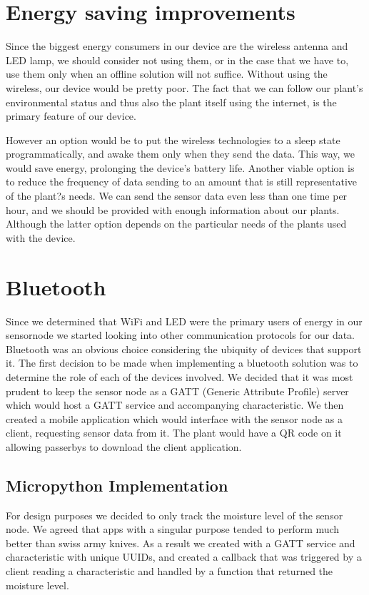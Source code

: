 \documentclass[10pt]{sensys-proc}
\begin{document}
\section{Energy saving improvements}
Since the biggest energy consumers in our device are the wireless antenna and LED lamp, we should consider not using them, or in the case that we have to, use them only when an offline solution will not suffice. Without using the wireless, our device would be pretty poor. The fact that we can follow our plant's environmental status and thus also the plant itself using the internet, is the primary feature of our device. 

However an option would be to put the wireless technologies to a sleep state programmatically, and awake them only when they send the data. This way, we would save energy, prolonging the device's battery life. Another viable option is to reduce the frequency of data sending to an amount that is still representative of the plant?s needs. We can send the sensor data even less than one time per hour, and we should be provided with enough information about our plants. Although the latter option depends on the particular needs of the plants used with the device. 
\bigskip

\section{Bluetooth}
Since we determined that WiFi and LED were the primary users of energy in our sensornode we started looking into other communication protocols for our data. Bluetooth was an obvious choice considering the ubiquity of devices that support it. The first decision to be made when implementing a bluetooth solution was to determine the role of each of the devices involved. We decided that it was most prudent to keep the sensor node as a GATT (Generic Attribute Profile) server which would host a GATT service and accompanying characteristic. We then created a mobile application which would interface with the sensor node as a client, requesting sensor data from it. The plant would have a QR code on it allowing passerbys to download the client application. 

\subsection{Micropython Implementation}
For design purposes we decided to only track the moisture level of the sensor node. We agreed that apps with a singular purpose tended to perform much better than swiss army knives. As a result we created with a GATT service and characteristic with unique UUIDs, and created a callback that was triggered by a client reading a characteristic and handled by a function that returned the moisture level. 
\end{document}

